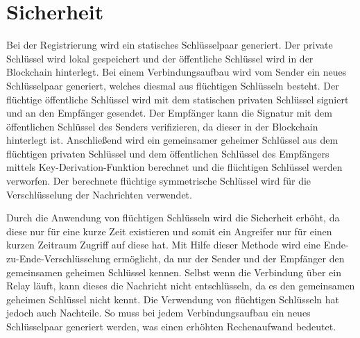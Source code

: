 \section{Sicherheit}
\label{subsec:sicherheit}


Bei der Registrierung wird ein statisches Schlüsselpaar generiert. Der private Schlüssel wird lokal gespeichert und der öffentliche Schlüssel wird in der Blockchain hinterlegt. Bei einem Verbindungsaufbau wird vom Sender ein neues Schlüsselpaar generiert, welches diesmal aus flüchtigen Schlüsseln besteht. Der flüchtige öffentliche Schlüssel wird mit dem statischen privaten Schlüssel signiert und an den Empfänger gesendet. Der Empfänger kann die Signatur mit dem öffentlichen Schlüssel des Senders verifizieren, da dieser in der Blockchain hinterlegt ist. Anschließend wird ein gemeinsamer geheimer Schlüssel aus dem flüchtigen privaten Schlüssel und dem öffentlichen Schlüssel des Empfängers mittels Key-Derivation-Funktion berechnet und die flüchtigen Schlüssel werden verworfen. Der berechnete flüchtige symmetrische Schlüssel wird für die Verschlüsselung der Nachrichten verwendet.

Durch die Anwendung von flüchtigen Schlüsseln wird die Sicherheit erhöht, da diese nur für eine kurze Zeit existieren und somit ein Angreifer nur für einen kurzen Zeitraum Zugriff auf diese hat.
Mit Hilfe dieser Methode wird eine Ende-zu-Ende-Verschlüsselung ermöglicht, da nur der Sender und der Empfänger den gemeinsamen geheimen Schlüssel kennen. Selbst wenn die Verbindung über ein Relay läuft, kann dieses die Nachricht nicht entschlüsseln, da es den gemeinsamen geheimen Schlüssel nicht kennt.
Die Verwendung von flüchtigen Schlüsseln hat jedoch auch Nachteile. So muss bei jedem Verbindungsaufbau ein neues Schlüsselpaar generiert werden, was einen erhöhten Rechenaufwand bedeutet. 
